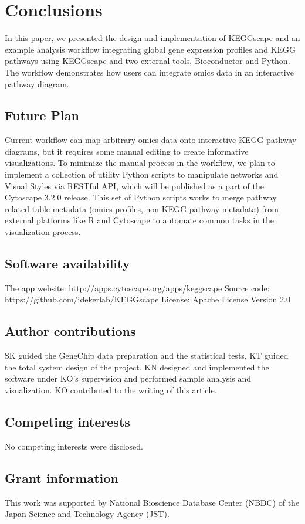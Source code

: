 \documentclass[10pt,a4paper,twocolumn]{article}
\begin{document}
\section*{Conclusions}
In this paper, we presented the design and implementation of KEGGscape and an example analysis workflow integrating global gene expression profiles and KEGG pathways using KEGGscape and two external tools, Bioconductor and Python. The workflow demonstrates how users can integrate omics data in an interactive pathway diagram.

\subsection*{Future Plan}
Current workflow can map arbitrary omics data onto interactive KEGG pathway diagrams, but it requires some manual editing to create informative visualizations.  To minimize the manual process in the workflow, we plan to implement a collection of utility Python scripts to manipulate networks and Visual Styles via RESTful API, which will be published as a part of the Cytoscape 3.2.0 release.  This set of Python scripts works to merge pathway related table metadata (omics profiles, non-KEGG pathway metadata) from external platforms like R and Cytoscape to automate common tasks in the visualization process.


\subsection*{Software availability}
The app website: http://apps.cytoscape.org/apps/keggscape
Source code: https://github.com/idekerlab/KEGGscape
License: Apache License Version 2.0

\subsection*{Author contributions}
SK guided the GeneChip data preparation and the statistical tests, KT guided the total system design of the project. KN designed and implemented the software under KO's supervision and performed sample analysis and visualization.  KO contributed to the writing of this article.

\subsection*{Competing interests}
No competing interests were disclosed.

\subsection*{Grant information}
This work was supported by National Bioscience Database Center (NBDC) of the Japan Science and Technology Agency (JST).
\end{document}
